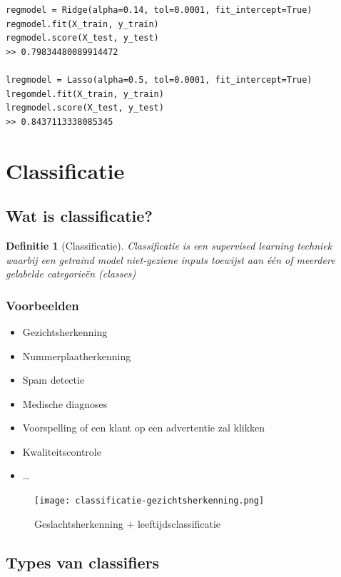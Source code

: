 \documentclass{article}
\newtheorem{theorem}{Definitie}[section]
\begin{document}
\begin{verbatim}
regmodel = Ridge(alpha=0.14, tol=0.0001, fit_intercept=True)
regmodel.fit(X_train, y_train)
regmodel.score(X_test, y_test)
>> 0.79834480089914472

lregmodel = Lasso(alpha=0.5, tol=0.0001, fit_intercept=True)
lregomdel.fit(X_train, y_train)
lregmodel.score(X_test, y_test)
>> 0.8437113338085345
\end{verbatim}

\section{Classificatie}

\subsection{Wat is classificatie?}

\begin{theorem}[Classificatie]
Classificatie is een supervised learning techniek waarbij een getraind model
niet-geziene inputs toewijst aan één of meerdere gelabelde categorieën (classes)
\end{theorem}

\subsubsection{Voorbeelden}

\begin{itemize}
    \item Gezichtsherkenning
    \item Nummerplaatherkenning
    \item Spam detectie
    \item Medische diagnoses
    \item Voorspelling of een klant op een advertentie zal klikken
    \item Kwaliteitscontrole
    \item \dots
\end{itemize}

\begin{figure}[H]
    \centering
    \texttt{[image: classificatie-gezichtsherkenning.png]}
    \caption{Geslachtsherkenning + leeftijdsclassificatie}
\end{figure}


\subsection{Types van classifiers}
\end{document}

